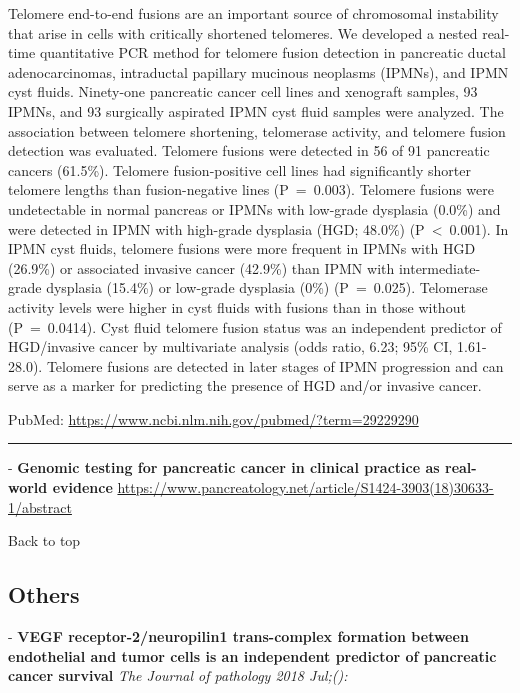\documentclass[]{article}
\begin{document}
Telomere end-to-end fusions are an important source of chromosomal
instability that arise in cells with critically shortened telomeres. We
developed a nested real-time quantitative PCR method for telomere fusion
detection in pancreatic ductal adenocarcinomas, intraductal papillary
mucinous neoplasms (IPMNs), and IPMN cyst fluids. Ninety-one pancreatic
cancer cell lines and xenograft samples, 93 IPMNs, and 93 surgically
aspirated IPMN cyst fluid samples were analyzed. The association between
telomere shortening, telomerase activity, and telomere fusion detection
was evaluated. Telomere fusions were detected in 56 of 91 pancreatic
cancers (61.5\%). Telomere fusion-positive cell lines had significantly
shorter telomere lengths than fusion-negative lines (P~=~0.003).
Telomere fusions were undetectable in normal pancreas or IPMNs with
low-grade dysplasia (0.0\%) and were detected in IPMN with high-grade
dysplasia (HGD; 48.0\%) (P~\textless{}~0.001). In IPMN cyst fluids,
telomere fusions were more frequent in IPMNs with HGD (26.9\%) or
associated invasive cancer (42.9\%) than IPMN with intermediate-grade
dysplasia (15.4\%) or low-grade dysplasia (0\%) (P~=~0.025). Telomerase
activity levels were higher in cyst fluids with fusions than in those
without (P~=~0.0414). Cyst fluid telomere fusion status was an
independent predictor of HGD/invasive cancer by multivariate analysis
(odds ratio, 6.23; 95\% CI, 1.61-28.0). Telomere fusions are detected in
later stages of IPMN progression and can serve as a marker for
predicting the presence of HGD and/or invasive cancer.

PubMed: \url{https://www.ncbi.nlm.nih.gov/pubmed/?term=29229290}

{}

{}

\begin{center}\rule{0.5\linewidth}{\linethickness}\end{center}

 - \textbf{Genomic testing for pancreatic cancer in clinical practice as
real-world evidence}
\url{https://www.pancreatology.net/article/S1424-3903(18)30633-1/abstract}

Back to top

\pagebreak

\hypertarget{others}{%
\subsection{Others}\label{others}}

 - \textbf{VEGF receptor-2/neuropilin1 trans-complex formation between
endothelial and tumor cells is an independent predictor of pancreatic
cancer survival} \emph{The Journal of pathology 2018 Jul;():}
\end{document}
